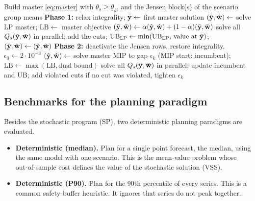 \begin{algorithm}[t]
\caption{Two-phase Benders with partial decomposition and in-out stabilisation}\label{alg:benders}
\small
\begin{algorithmic}[1]
\State Build master \eqref{eq:master} with $\theta_s\ge\underline\theta_s$, and the Jensen block(s) of the scenario group means
\State \textbf{Phase 1:} relax integrality; $\bar{\mathbf{y}}\gets$ first master solution
\Repeat
  \State $(\hat{\mathbf{y}},\hat{\mathbf{w}})\gets$ solve LP master; $\mathrm{LB}\gets$ master objective
  \State $(\tilde{\mathbf{y}},\tilde{\mathbf{w}})\gets\alpha(\hat{\mathbf{y}},\hat{\mathbf{w}})+(1-\alpha)(\bar{\mathbf{y}},\bar{\mathbf{w}})$
  \State solve all $Q_s(\tilde{\mathbf{y}},\tilde{\mathbf{w}})$ in parallel; add the cuts; $\mathrm{UB}_{\mathrm{LP}}\gets\min(\mathrm{UB}_{\mathrm{LP}},\,\text{value at }\tilde{\mathbf{y}})$; $(\bar{\mathbf{y}},\bar{\mathbf{w}})\gets(\tilde{\mathbf{y}},\tilde{\mathbf{w}})$
\State \textbf{Phase 2:} deactivate the Jensen rows, restore integrality, $\epsilon_0\gets 2\cdot10^{-3}$
\Repeat
  \State $(\hat{\mathbf{y}},\hat{\mathbf{w}})\gets$ solve master MIP to gap $\epsilon_k$ (MIP start: incumbent); $\mathrm{LB}\gets\max(\mathrm{LB},\text{dual bound})$
  \State solve all $Q_s(\hat{\mathbf{y}},\hat{\mathbf{w}})$ in parallel; update incumbent and UB; add violated cuts
  \State if no cut was violated, tighten $\epsilon_k$
\end{algorithmic}
\end{algorithm}

\subsection{Benchmarks for the planning paradigm}
Besides the stochastic program (SP), two deterministic planning paradigms are evaluated.
\begin{itemize}
  \item \textbf{Deterministic (median).} Plan for a single point forecast, the median, using the same model with one scenario. This is the mean-value problem whose out-of-sample cost defines the value of the stochastic solution (VSS).
  \item \textbf{Deterministic (P90).} Plan for the 90th percentile of every series. This is a common safety-buffer heuristic. It ignores that series do not peak together.
\end{itemize}
